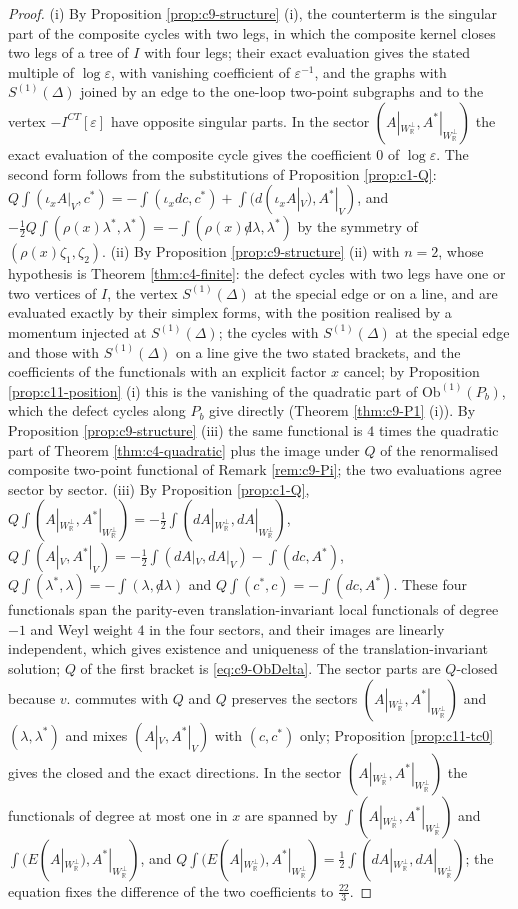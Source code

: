 \begin{proof}
(i) By Proposition \ref{prop:c9-structure} (i), the counterterm is the singular part of the composite cycles with two legs, in which the composite kernel closes two legs of a tree of $I$ with four legs; their exact evaluation gives the stated multiple of $\log\varepsilon$, with vanishing coefficient of $\varepsilon^{-1}$, and the graphs with $S^{(1)}(\Delta)$ joined by an edge to the one-loop two-point subgraphs and to the vertex $-I^{CT}[\varepsilon]$ have opposite singular parts. In the sector $(A|_{W_{\mathbb R}^\perp},A^*|_{W_{\mathbb R}^\perp})$ the exact evaluation of the composite cycle gives the coefficient $0$ of $\log\varepsilon$. The second form follows from the substitutions of Proposition \ref{prop:c1-Q}: $Q\int(\iota_xA|_V,c^*)=-\int(\iota_xdc,c^*)+\int(d(\iota_xA|_V),A^*|_V)$, and $-\tfrac12Q\int(\rho(x)\lambda^*,\lambda^*)=-\int(\rho(x){\not d}\lambda,\lambda^*)$ by the symmetry of $(\rho(x)\zeta_1,\zeta_2)$. (ii) By Proposition \ref{prop:c9-structure} (ii) with $n=2$, whose hypothesis is Theorem \ref{thm:c4-finite}: the defect cycles with two legs have one or two vertices of $I$, the vertex $S^{(1)}(\Delta)$ at the special edge or on a line, and are evaluated exactly by their simplex forms, with the position realised by a momentum injected at $S^{(1)}(\Delta)$; the cycles with $S^{(1)}(\Delta)$ at the special edge and those with $S^{(1)}(\Delta)$ on a line give the two stated brackets, and the coefficients of the functionals with an explicit factor $x$ cancel; by Proposition \ref{prop:c11-position} (i) this is the vanishing of the quadratic part of $\mathrm{Ob}^{(1)}(P_b)$, which the defect cycles along $P_b$ give directly (Theorem \ref{thm:c9-P1} (i)). By Proposition \ref{prop:c9-structure} (iii) the same functional is $4$ times the quadratic part of Theorem \ref{thm:c4-quadratic} plus the image under $Q$ of the renormalised composite two-point functional of Remark \ref{rem:c9-Pi}; the two evaluations agree sector by sector. (iii) By Proposition \ref{prop:c1-Q}, $Q\int(A|_{W_{\mathbb R}^\perp},A^*|_{W_{\mathbb R}^\perp})=-\tfrac12\int(dA|_{W_{\mathbb R}^\perp},dA|_{W_{\mathbb R}^\perp})$, $Q\int(A|_V,A^*|_V)=-\tfrac12\int(dA|_V,dA|_V)-\int(dc,A^*)$, $Q\int(\lambda^*,\lambda)=-\int(\lambda,{\not d}\lambda)$ and $Q\int(c^*,c)=-\int(dc,A^*)$. These four functionals span the parity-even translation-invariant local functionals of degree $-1$ and Weyl weight $4$ in the four sectors, and their images are linearly independent, which gives existence and uniqueness of the translation-invariant solution; $Q$ of the first bracket is \eqref{eq:c9-ObDelta}. The sector parts are $Q$-closed because $v.$ commutes with $Q$ and $Q$ preserves the sectors $(A|_{W_{\mathbb R}^\perp},A^*|_{W_{\mathbb R}^\perp})$ and $(\lambda,\lambda^*)$ and mixes $(A|_V,A^*|_V)$ with $(c,c^*)$ only; Proposition \ref{prop:c11-tc0} gives the closed and the exact directions. In the sector $(A|_{W_{\mathbb R}^\perp},A^*|_{W_{\mathbb R}^\perp})$ the functionals of degree at most one in $x$ are spanned by $\int(A|_{W_{\mathbb R}^\perp},A^*|_{W_{\mathbb R}^\perp})$ and $\int(E(A|_{W_{\mathbb R}^\perp}),A^*|_{W_{\mathbb R}^\perp})$, and $Q\int(E(A|_{W_{\mathbb R}^\perp}),A^*|_{W_{\mathbb R}^\perp})=\tfrac12\int(dA|_{W_{\mathbb R}^\perp},dA|_{W_{\mathbb R}^\perp})$; the equation fixes the difference of the two coefficients to $\tfrac{22}3$.
\end{proof}

